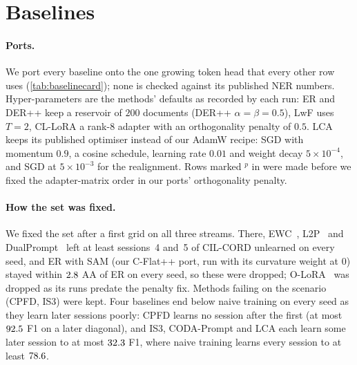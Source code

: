 \section{Baselines}
\label{app:baselines}

\begin{table}[t]
\centering\scriptsize
\setlength{\tabcolsep}{3pt}
\caption{\textbf{Baseline card} (the methods of ). What our port changes against the published method, what it keeps across sessions, and the number of seeds behind each cell ($\dagger$: legacy protocol). Legacy cells early-stop on the session's test split; their epoch cap is $100$ for ER, DER++, LwF, CPFD and IS3, $30$ for CODA-Prompt and CL-LoRA and $10$ for LCA and the CoLaR family; most ran in fp16 mixed precision, but IS3 and LCA always in fp32, and seed 42 of several CIL-CORD baselines in fp32, so some cells mix precisions across seeds. LwF excludes one fp16 seed per scenario that collapsed to all-background. The first DIL grid saved no configuration; its settings are the grid script's defaults. Generated.}
\label{tab:baselinecard}

\end{table}

\paragraph{Ports.} We port every baseline onto the one growing token head that every other row uses (\cref{tab:baselinecard}); none is checked against its published NER numbers. Hyper-parameters are the methods' defaults as recorded by each run: ER and DER++ keep a reservoir of $200$ documents (DER++ $\alpha{=}\beta{=}0.5$), LwF uses $T{=}2$, CL-LoRA a rank-$8$ adapter with an orthogonality penalty of $0.5$. LCA keeps its published optimiser instead of our AdamW recipe: SGD with momentum $0.9$, a cosine schedule, learning rate $0.01$ and weight decay $5{\times}10^{-4}$, and SGD at $5{\times}10^{-3}$ for the realignment. Rows marked $^{p}$ in  were made before we fixed the adapter-matrix order in our ports' orthogonality penalty.

\paragraph{How the set was fixed.} We fixed the set after a first grid on all three streams. There, EWC~\citep{kirkpatrick2017ewc}, L2P~\citep{wang2022l2p} and DualPrompt~\citep{wang2022dualprompt} left at least sessions~4 and~5 of CIL-CORD unlearned on every seed, and ER with SAM (our C-Flat++ port, run with its curvature weight at $0$) stayed within $2.8$ AA of ER on every seed, so these were dropped; O-LoRA~\citep{wang2023olora} was dropped as its runs predate the penalty fix. Methods failing on the scenario (CPFD, IS3) were kept. Four baselines end below naive training on every seed as they learn later sessions poorly: CPFD learns no session after the first (at most $92.5$ F1 on a later diagonal), and IS3, CODA-Prompt and LCA each learn some later session to at most $32.3$ F1, where naive training learns every session to at least $78.6$.

